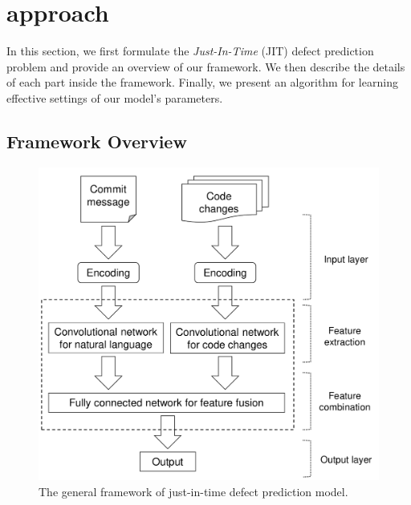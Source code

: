 \section{approach}
\label{sec:approach}
In this section, we first formulate the \emph{Just-In-Time} (JIT) defect prediction problem and provide an overview of our framework. We then describe the details of each part inside the framework. Finally, we present an algorithm for learning effective settings of our model's parameters. 
\subsection{Framework Overview}
\label{sec:overview}

\begin{figure}
\center
\includegraphics[scale=0.36]{figs/framework.pdf}
\caption{The general framework of just-in-time defect prediction model.}
\label{fig:overview}
\end{figure}

